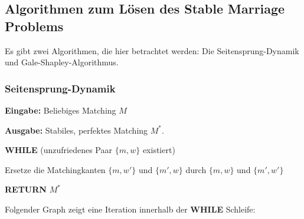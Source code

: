 \documentclass{panikzettel}
\newcommand\tab[1][1cm]{\hspace*{#1}}
\begin{document}
\subsection{Algorithmen zum Lösen des Stable Marriage Problems}

Es gibt zwei Algorithmen, die hier betrachtet werden: Die Seitensprung-Dynamik und Gale-Shapley-Algorithmus.

\subsubsection{Seitensprung-Dynamik}
\begin{algo}
	\textbf{Eingabe:} Beliebiges Matching $M$
	
	\textbf{Ausgabe:} Stabiles, perfektes Matching $M^*$.
	\tcblower
	
	\textbf{WHILE} (unzufriedenes Paar $\{m,w\}$ existiert)

	\tab Ersetze die Matchingkanten $\{m,w'\}$ und $\{m',w\}$ durch $\{m,w\}$ und $\{m',w'\}$
   
	\textbf{RETURN} $M^*$
	
\end{algo}

Folgender Graph zeigt eine Iteration innerhalb der \textbf{WHILE} Schleife:
\end{document}
